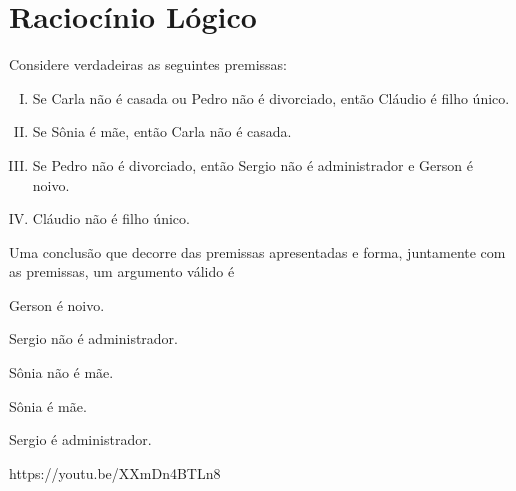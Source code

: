 \chapter{Raciocínio Lógico}


{Considere verdadeiras as seguintes premissas:
\begin{enumerate}[I.]
\item Se Carla não é casada ou Pedro não é divorciado, então Cláudio é filho único.
\item Se Sônia é mãe, então Carla não é casada.
\item Se Pedro não é divorciado, então Sergio não é administrador e Gerson é noivo.
\item Cláudio não é filho único.
\end{enumerate}
Uma conclusão que decorre das premissas apresentadas
e forma, juntamente com as premissas, um argumento
válido é
}{\item Gerson é noivo.
\item Sergio não é administrador.
\item Sônia não é mãe.
\item Sônia é mãe.
\item Sergio é administrador.}
{https://youtu.be/XXmDn4BTLn8}
